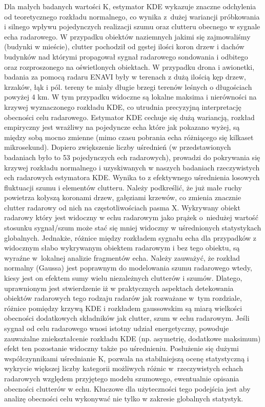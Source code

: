 Dla małych badanych wartości K, estymator KDE wykazuje znaczne odchylenia od teoretycznego rozkładu normalnego, co wynika z~dużej wariancji próbkowania i silnego wpływu pojedynczych realizacji szumu oraz clutteru obecnego w sygnale echa radarowego. W przypadku obiektów naziemnych jakimi się zajmowaliśmy (budynki w mieście), clutter pochodził od gęstej ilości koron drzew i dachów budynków nad którymi propagował sygnał radarowego sondowania i odbitego oraz rozproszonego na oświetlonych obiektach. W przypadku drona i awionetki, badania za pomocą radaru ENAVI były w terenach z dużą ilością kęp drzew, krzaków, łąk i pól. tereny te miały długie brzegi terenów leśnych o długościach powyżej 4 km. W tym przypadku widoczne są lokalne maksima i nierówności na krzywej wyznaczonego rozkładu KDE, co utrudnia precyzyjną interpretację obecności celu radarowego. Estymator KDE cechuje się dużą wariancją, rozkład empiryczny jest wrażliwy na pojedyncze echa które jak pokazano wyżej, są między sobą mocno zmienne (mimo czasu pobrania echa różniącego się kilkaset mikrosekund). Dopiero zwiększenie liczby uśrednień (w przedstawionych badaniach było to 53 pojedynczych ech radarowych), prowadzi do pokrywania się krzywej rozkładu normalnego i uzyskiwanych w naszych badaniach rzeczywistych ech radarowych estymatora KDE. Wynika to z efektywnego uśrednienia losowych fluktuacji szumu i elementów clutteru. Należy podkreślić, że już małe ruchy powietrza kołyszą koronami drzew, gałęziami krzewów, co zmienia znacznie clutter radarowy od nich na częstotliwościach pasma X. Wykrywany obiekt radarowy który jest widoczny w echu radarowym jako prążek o~niedużej wartość stosunku sygnał/szum może stać się mniej widoczny w uśrednionych statystykach globalnych. Jednakże, różnice między rozkładem sygnału echa dla przypadków z widocznym słabo wykrywanym obiektem radarowym i bez tego obiektu, są wyraźne w~lokalnej analizie fragmentów echa. Należy zauważyć, że rozkład normalny (Gaussa) jest poprawnym do modelowania szumu radarowego wtedy, kiesy jest on efektem sumy wielu niezależnych clutterów i szumów. Dlatego, uprawnionym jest stwierdzenie iż w praktycznych aspektach detekowania obiektów radarowych tego rodzaju radarów jak rozważane w~tym rozdziale, różnice pomiędzy krzywą KDE i rozkładem gaussowskim są miarą wielkości obecności dodatkowych składników jak clutter, szum w echu radarowym. Jeśli sygnał od celu radarowego wnosi istotny udział energetyczny, powoduje zauważalne zniekształcenie rozkładu KDE (np. asymetrię, dodatkowe maksimum) efekt ten pozostanie widoczny także po uśrednieniu.  Posłużenie się dużymi współczynnikami uśrednianie K, pozwala na stabilniejszą ocenę statystyczną i wykrycie większej liczby kategorii możliwych różnic w~rzeczywistych echach radarowych względem przyjętego modelu szumowego, ewentualnie opisania obecności clutterów w echu. Kluczowe dla użyteczności tego podejścia jest aby analizę obecności celu wykonywać nie tylko w zakresie globalnych statystyk. 
